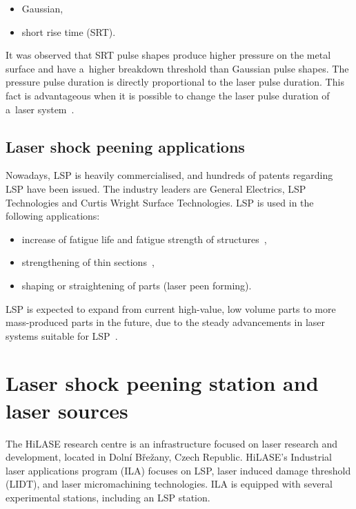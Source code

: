 \begin{itemize}

    \item Gaussian,
    \item short rise time (SRT).
    
\end{itemize}
It was observed that SRT pulse shapes produce higher pressure on the metal surface and have a~higher breakdown threshold than Gaussian pulse shapes. The pressure pulse duration is directly proportional to the laser pulse duration.  This fact is advantageous when it is possible to change the laser pulse duration of a~laser system~\cite{devaux_fabbro_tollier_bartnicki_1993}. 


\subsection{Laser shock peening applications}

Nowadays, LSP is heavily commercialised, and hundreds of patents regarding LSP have been issued. The industry leaders are General Electrics, LSP Technologies and Curtis Wright Surface Technologies. LSP is used in the following applications:

\begin{itemize}
 
    \item increase of fatigue life and fatigue strength of structures~\cite{dane_hackel_daly_harrisson_2000},
    \item strengthening of thin sections~\cite{vaccari_1992},
    \item shaping or straightening of parts  (laser peen forming).

\end{itemize}
LSP is expected to expand from current high-value, low volume parts to more mass-produced parts in the future, due to the steady advancements in laser systems suitable for \mbox{LSP~\cite{clauer_2019}}. 



\section{Laser shock peening station and laser sources}

The HiLASE research centre is an infrastructure focused on laser research and development, located in Dolní Břežany, Czech Republic. HiLASE's Industrial laser applications program (ILA) focuses on LSP, laser induced damage threshold (LIDT), and laser micromachining technologies. ILA is equipped with several experimental stations, including an LSP station. 

